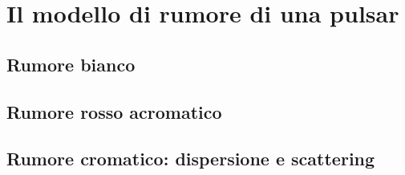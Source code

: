
\chapter{Il modello di rumore di una pulsar} \label{chpt:rumore}
\sloppy


\section{Rumore bianco} \label{sec:rumore_bianco}

\section{Rumore rosso acromatico} \label{sec:rumore_rosso}

\section{Rumore cromatico: dispersione e scattering} \label{sec:rumore_cromatico}

